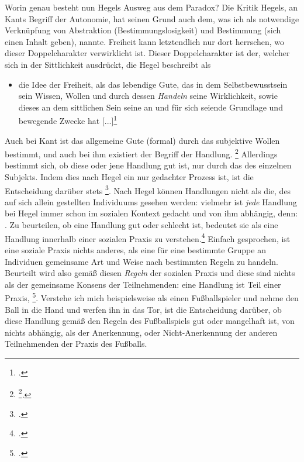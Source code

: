 \documentclass[12pt, a4paper, openany]{report}
\begin{document}
Worin genau besteht nun Hegels Ausweg aus dem Paradox?
Die Kritik Hegels, an Kants Begriff der Autonomie, hat seinen Grund auch dem, was ich als notwendige Verknüpfung von Abstraktion (Bestimmungslosigkeit) und Bestimmung (sich einen Inhalt geben), nannte. 
Freiheit kann letztendlich nur dort herrschen, wo dieser Doppelcharakter verwirklicht ist.
Dieser Doppelcharakter ist der, welcher sich in der Sittlichkeit ausdrückt, die Hegel beschreibt als 
\begin{itemize}
    \item[] die Idee der Freiheit, als das lebendige Gute, das in dem Selbstbewusstsein sein Wissen, Wollen und durch dessen \textit{Handeln} seine Wirklichkeit, sowie dieses an dem sittlichen Sein seine an und für sich seiende Grundlage und bewegende Zwecke hat [...]\footcite[][§ 142, S. 161. Hervorhebung von mir]{hegel_grundlinien_2017} 
\end{itemize}
Auch bei Kant ist das allgemeine Gute (formal) durch das subjektive Wollen bestimmt,
und auch bei ihm existiert der Begriff der Handlung.%
\footnote{
    \footcite[][S. 51. Hervorhebung von mir.]{kant_kritik_2014}.
}
Allerdings bestimmt sich, ob diese oder jene Handlung gut ist, nur durch das  des einzelnen Subjekts.
Indem dies nach Hegel ein nur gedachter Prozess ist, ist die Entscheidung darüber stets \footcite[][§ 132 A, S. 136]{hegel_grundlinien_2017}.
Nach Hegel können Handlungen nicht als die, des auf sich allein gestellten Individuums gesehen werden:
vielmehr ist \emph{jede} Handlung bei Hegel immer schon im sozialen Kontext gedacht und von ihm abhängig, denn:
.
Zu beurteilen, ob eine Handlung gut oder schlecht ist, bedeutet sie als eine Handlung innerhalb einer sozialen Praxis zu verstehen.\footcite[Vgl][28]{menke_autonomie_2018}
Einfach gesprochen, ist eine soziale Praxis nichts anderes, als eine für eine bestimmte Gruppe an Individuen gemeinsame Art und Weise nach bestimmten Regeln zu handeln.
Beurteilt wird also gemäß diesen \emph{Regeln} der sozialen Praxis und diese sind nichts als der gemeinsame Konsens der Teilnehmenden: 
eine Handlung ist Teil einer Praxis, \footcite[][65]{khurana_paradox_2019}.
Verstehe ich mich beispielsweise als einen Fußballspieler und nehme den Ball in die Hand und werfen ihn in das Tor, ist die Entscheidung darüber, ob diese Handlung gemäß den Regeln des Fußballspiels gut oder mangelhaft ist, von nichts abhängig, als der Anerkennung, oder Nicht-Anerkennung der anderen Teilnehmenden der Praxis des Fußballs.
\end{document}
